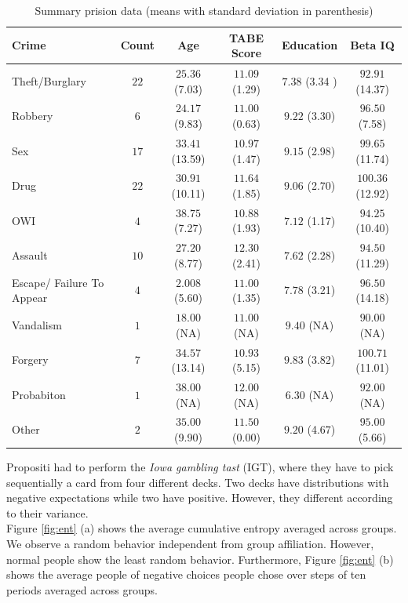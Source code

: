 \documentclass[12pt,a4paper,bibliography=totocnumbered,listof=totocnumbered]{scrartcl}
\begin{document}
\begin{table}[!htbp]
	\footnotesize
	 \centering 
	\begin{tabular}{ l|ccccc} 
		\toprule 
		Crime & \textbf{Count} & \textbf{Age} & \textbf{TABE Score} & \textbf{Education} & \textbf{Beta IQ} \\ 
		\hline
	Theft/Burglary & $22$ & $25.36$  (7.03) & $11.09$ (1.29) & $7.38$ (3.34 )& $92.91$ (14.37) \\ 
	Robbery & $6$ & $24.17$ (9.83) & $11.00$ (0.63) & $9.22$ (3.30) & $96.50$ (7.58) \\          
	Sex & $17$ & $33.41$ (13.59) & $10.97$ (1.47) & $9.15$ (2.98) & $99.65$ (11.74) \\       
	Drug & $22$ & $30.91$ (10.11)  & $11.64$ (1.85)& $9.06$   (2.70)  & $100.36$ (12.92) \\     
	OWI & $4$ & $38.75$ (7.27) & $10.88$ (1.93) & $7.12$ (1.17)& $94.25$ (10.40) \\        
	Assault & $10$ & $27.20$ (8.77) & $12.30$ (2.41)& $7.62$ (2.28) & $94.50$ (11.29) \\       
	Escape/ Failure To Appear & $4$ & $2.008$ (5.60)& $11.00$ (1.35)& $7.78$  (3.21)& $96.50$  (14.18)\\     
	Vandalism & $1$ & $18.00$ (NA)& $11.00$ (NA)& $9.40$ (NA)& $90.00$ (NA)\\ 
	Forgery & $7$ & $34.57$ (13.14)& $10.93$ (5.15) & $9.83$ (3.82)& $100.71$ (11.01)\\       
	Probabiton & $1$ & $38.00$ (NA)& $12.00$ (NA)& $6.30$ (NA)& $92.00$ (NA)\\ 
	Other & $2$ & $35.00$ (9.90)& $11.50$ (0.00)& $9.20$ (4.67)& $95.00$ (5.66)\\       
		\bottomrule 
	\end{tabular} 
		\caption{Summary prision data (means with standard deviation in parenthesis)} 
		\label{tab:tabps} 
\end{table} 

Propositi had to perform the \textit{Iowa gambling tast} (IGT), where they have to pick sequentially a card from four different decks. Two decks have distributions with negative expectations while two have positive. However, they different according to their variance. \\
Figure \ref{fig:ent} (a) shows the average cumulative entropy averaged across groups. We observe a random behavior independent from group affiliation. However, normal people show the least random behavior. Furthermore, Figure \ref{fig:ent} (b) shows the average people of negative choices people chose over steps of ten periods averaged across groups.     
\end{document}
